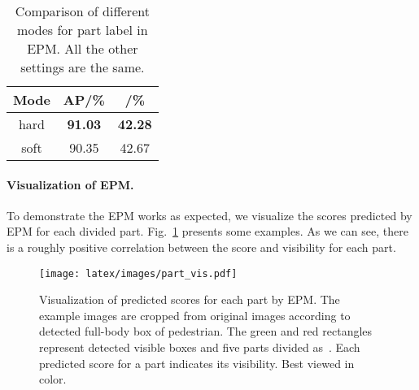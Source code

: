 \documentclass[10pt,twocolumn,letterpaper]{article}
\begin{document}
\begin{table}[ht]
	\centering
  \caption{Comparison of different modes for part label in EPM. All the other settings are the same.
	}
	\label{tbl:crowd_label_EPM}
	\begin{tabular}{c|cc}
		\toprule
		 Mode & AP/\% & /\% \\
		\hline
		hard & \textbf{91.03} & \textbf{42.28} \\
		soft & 90.35 & 42.67 \\
		\bottomrule
	\end{tabular}
\end{table}

\paragraph{Visualization of EPM.} To demonstrate the EPM works as expected, we visualize the scores predicted by EPM for each divided part. Fig.~\ref{fig:vis_part} presents some examples. As we can see, there is a roughly positive correlation between the score and visibility for each part.

\begin{figure}[!t]
\begin{center}
 \texttt{[image: latex/images/part\_vis.pdf]}
\end{center}
   \caption{Visualization of predicted scores for each part by EPM. The example images are cropped from original images according to detected full-body box of pedestrian. The green and red rectangles represent detected visible boxes and five parts divided as~\cite{zhang2018Occlusionaware}. Each predicted score for a part indicates its visibility. Best viewed in color.}
\label{fig:vis_part}
\end{figure}
\end{document}

